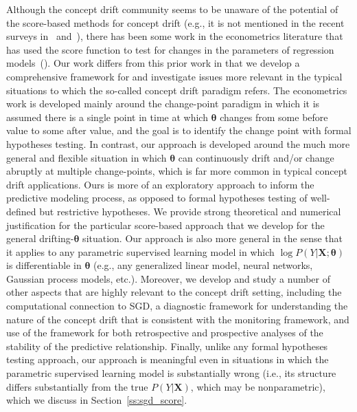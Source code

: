 \documentclass[twoside,11pt]{article}
\begin{document}
Although the concept drift community seems to be unaware of the potential of the score-based methods for concept drift (e.g., it is not mentioned in the recent surveys in~\cite{barros2018large} and~\cite{lu2018learning}), there has been some work in the econometrics literature that has used the score function to test for changes in the parameters of regression models~(\cite{kuan1995generalized,zeileis2005unified,zeileis2007generalized,xia2009monitoring}). Our work differs from this prior work in that we develop a comprehensive framework for and investigate issues more relevant in the typical situations to which the so-called concept drift paradigm refers. The econometrics work is developed mainly around the change-point paradigm in which it is assumed there is a single point in time at which $\bm{\theta}$ changes from some before value to some after value, and the goal is to identify the change point with formal hypotheses testing. In contrast, our approach is developed around the much more general and flexible situation in which $\bm{\theta}$ can continuously drift and/or change abruptly at multiple change-points, which is far more common in typical concept drift applications. Ours is more of an exploratory approach to inform the predictive modeling process, as opposed to formal hypotheses testing of well-defined but restrictive hypotheses. We provide strong theoretical and numerical justification for the particular score-based approach that we develop for the general drifting-$\bm{\theta}$ situation. Our approach is also more general in the sense that it applies to any parametric supervised learning model in which $\log{P(Y|\bm{X};\bm{\theta})}$ is differentiable in $\bm{\theta}$ (e.g., any generalized linear model, neural networks, Gaussian process models, etc.). Moreover, we develop and study a number of other aspects that are highly relevant to the concept drift setting, including the computational connection to SGD, a diagnostic framework for understanding the nature of the concept drift that is consistent with the monitoring framework, and use of the framework for both retrospective and prospective analyses of the stability of the predictive relationship. Finally, unlike any formal hypotheses testing approach, our approach is meaningful even in situations in which the parametric supervised learning model is substantially wrong (i.e., its structure differs substantially from the true $P(Y|\bm{X})$, which may be nonparametric), which we discuss in Section~\ref{ss:sgd_score}.
\end{document}
